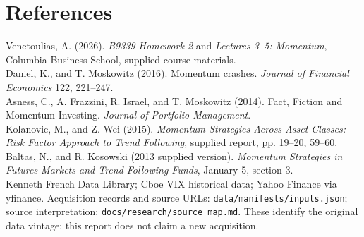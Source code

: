 \documentclass[11pt]{article}
\begin{document}
\section*{References}
\small
Venetoulias, A. (2026). \emph{B9339 Homework 2} and \emph{Lectures 3--5: Momentum}, Columbia Business School, supplied course materials.\\[4pt]
Daniel, K., and T. Moskowitz (2016). Momentum crashes. \emph{Journal of Financial Economics} 122, 221--247.\\[4pt]
Asness, C., A. Frazzini, R. Israel, and T. Moskowitz (2014). Fact, Fiction and Momentum Investing. \emph{Journal of Portfolio Management}.\\[4pt]
Kolanovic, M., and Z. Wei (2015). \emph{Momentum Strategies Across Asset Classes: Risk Factor Approach to Trend Following}, supplied report, pp. 19--20, 59--60.\\[4pt]
Baltas, N., and R. Kosowski (2013 supplied version). \emph{Momentum Strategies in Futures Markets and Trend-Following Funds}, January 5, section 3.\\[4pt]
Kenneth French Data Library; Cboe VIX historical data; Yahoo Finance via yfinance. Acquisition records and source URLs: \texttt{data/manifests/inputs.json}; source interpretation: \texttt{docs/research/source\_map.md}. These identify the original data vintage; this report does not claim a new acquisition.
\end{document}
